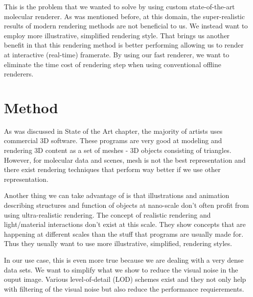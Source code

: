 \documentclass[
  digital, %
  table,   %
  nolof,     %
  nolot,     %
]{fithesis3}
\begin{document}
This is the problem that we wanted to solve by using custom state-of-the-art molecular renderer. As was mentioned before, at this domain, the super-realistic results of modern rendering methods are not beneficial to us. We instead want to employ more illustrative, simplified rendering style. That brings us another benefit in that this rendering method is better performing allowing us to render at interactive (real-time) framerate. By using our fast renderer, we want to eliminate the time cost of rendering step when using conventional offline renderers.

\chapter{Method}
\label{chap:method}

As was discussed in State of the Art chapter, the majority of artists uses commercial 3D software. These programs are very good at modeling and rendering 3D content as a set of meshes - 3D objects consisting of triangles. However, for molecular data and scenes, mesh is not the best representation and there exist rendering techniques that perform way better if we use other representation.

Another thing we can take advantage of is that illustrations and animation describing structures and function of objects at nano-scale don't often profit from using ultra-realistic rendering. The concept of realistic rendering and light/material interactions don't exist at this scale. They show concepts that are happening at different scales than the stuff that programs are usually made for. Thus they usually want to use more illustrative, simplified, rendering styles.

In our use case, this is even more true because we are dealing with a very dense data sets. We want to simplify what we show to reduce the visual noise in the ouput image. Various level-of-detail (LOD) schemes exist and they not only help with filtering of the visual noise but also reduce the performance requierements.
\end{document}
